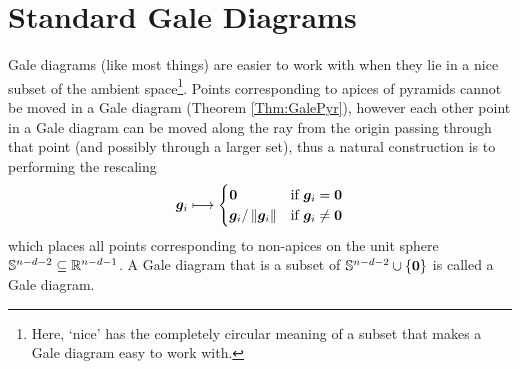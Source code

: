 \section{Standard Gale Diagrams}
Gale diagrams (like most things) are easier to work with when they lie in a nice subset of the ambient space\footnote{Here, `nice' has the completely circular meaning of a subset that makes a Gale diagram easy to work with.}.  Points corresponding to apices of pyramids cannot be moved in a Gale diagram (Theorem \ref{Thm:GalePyr}), however each other point in a Gale diagram can be moved along the ray from the origin passing through that point (and possibly through a larger set), thus a natural construction is to performing the rescaling
    \[
        \bm{g}_i
            \longmapsto
            \begin{cases}
                \bm{0}                   &\text{if }\bm{g}_i=\bm{0}\\
                \bm{g}_i/\left\lVert\bm{g}_i\right\rVert  &\text{if }\bm{g}_i\ne\bm{0}
            \end{cases}
    \]
which places all points corresponding to non-apices on the unit sphere \(\mathbb{S}^{n-d-2}\subseteq\mathbb{R}^{n-d-1}\).  A Gale diagram that is a subset of \(\mathbb{S}^{n-d-2}\cup\left\{\bm{0}\right\}\) is called a  Gale diagram.

